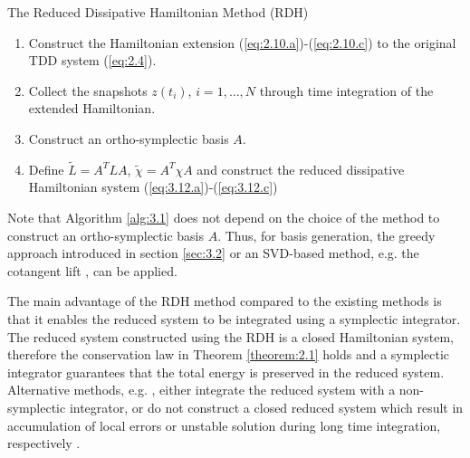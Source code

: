 \begin{algorithm}
\caption{The Reduced Dissipative Hamiltonian Method (RDH)} \label{alg:3.1}
\begin{enumerate}
	\item Construct the Hamiltonian extension (\ref{eq:2.10.a})-(\ref{eq:2.10.c}) to the original TDD system (\ref{eq:2.4}).
	\item Collect the snapshots $z(t_i)$, $i=1,\dots,N$ through time integration of the extended Hamiltonian.
	\item Construct an ortho-symplectic basis $A$.
	\item Define $\tilde L = A^T L A$, $\tilde \chi = A^T \chi A$ and construct the reduced dissipative Hamiltonian system (\ref{eq:3.12.a})-(\ref{eq:3.12.c})
\end{enumerate}
\end{algorithm}

Note that Algorithm \ref{alg:3.1} does not depend on the choice of the method to construct an ortho-symplectic basis $A$. Thus, for basis generation, the greedy approach introduced in section \ref{sec:3.2} or an SVD-based method, e.g. the cotangent lift \cite{Peng:2014di}, can be applied.

The main advantage of the RDH method compared to the existing methods is that it enables the reduced system to be integrated using a symplectic integrator. The reduced system constructed using the RDH is a closed Hamiltonian system, therefore the conservation law in Theorem \ref{theorem:2.1} holds and a symplectic integrator guarantees that the total energy is preserved in the reduced system. Alternative methods, e.g. \cite{peng2016geometric,Polyuga:2010gj,beattie2011structure}, either integrate the reduced system with a non-symplectic integrator, or do not construct a closed reduced system which result in accumulation of local errors or unstable solution during long time integration, respectively \cite{Hairer:1250576}.

